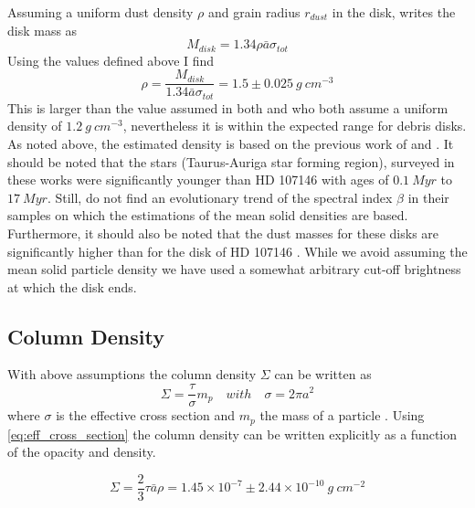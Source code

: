 \documentclass{aa}
\begin{document}
Assuming a uniform dust density $\rho$ and grain radius $r_{dust}$ in the disk, \cite{wyatt2008evolution} writes the disk mass as
\begin{equation}
\label{eq:disk_mass_wyatt}
    M_{disk} = 1.34 \rho \bar{a} \sigma_{tot}
\end{equation}
Using the values defined above I find
\begin{equation}
\label{eq:mean_density_wyatt}
    \rho  = \frac{M_{disk}}{1.34 \bar{a} \sigma_{tot}} = 1.5 \pm 0.025 ~g~cm^{-3}
\end{equation}
This is larger than the value assumed in both \cite{ricci2015alma} and \cite{vanSluijs2018feasibility} who both assume a uniform density of $1.2~g~cm^{-3}$, nevertheless it is within the expected range for debris disks. As noted above, the estimated density is based on the previous work of \cite{miyake1993effects} and \cite{ricci2010dust}. It should be noted that the stars (Taurus-Auriga star forming region), surveyed in these works were significantly younger than HD 107146 with ages of $0.1~Myr$ to $17~Myr$. Still, \cite{ricci2010dust} do not find an evolutionary trend of the spectral index $\beta$ in their samples on which the estimations of the mean solid densities are based. Furthermore, it should also be noted that the dust masses for these disks are significantly higher than for the disk of HD 107146 \citep{ricci2010dust}. While we avoid assuming the mean solid particle density we have used a somewhat arbitrary cut-off brightness at which the disk ends.


\subsection{Column Density}
\label{sec:dis_column_density}

With above assumptions the column density $\Sigma$ can be written as
\begin{equation}
    \label{eq:column_density}
    \Sigma=\frac{\tau}{\sigma} m_{p} \quad with \quad \sigma=2 \pi a^{2}
\end{equation}
where  $\sigma$ is the effective cross section and $m_p$ the mass of a particle \citep{vanSluijs2018feasibility}. Using \autoref{eq:eff_cross_section} the column density can be written explicitly as a function of the opacity and density.

\begin{equation}
\label{eq:column_density2}
    \Sigma=\frac{2}{3} \tau \bar{a} \rho = 1.45 \times 10^{-7} \pm 2.44 \times 10^{-10} ~g ~cm^{-2} %
\end{equation}
\end{document}
